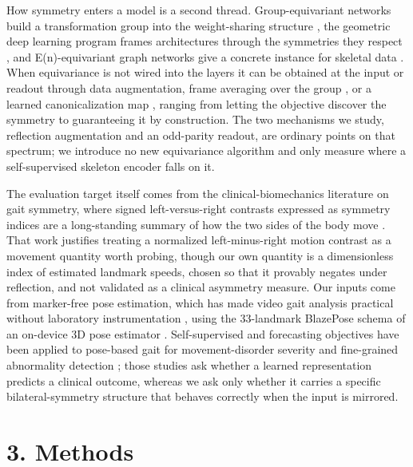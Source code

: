 \documentclass{article}
\begin{document}
How symmetry enters a model is a second thread. Group-equivariant
networks build a transformation group into the weight-sharing structure
\citep{cohen2016gcnn}, the geometric deep learning program frames
architectures through the symmetries they respect
\citep{bronstein2021gdl}, and E(n)-equivariant graph networks give a
concrete instance for skeletal data \citep{satorras2021egnn}. When
equivariance is not wired into the layers it can be obtained at the
input or readout through data augmentation, frame averaging over the
group \citep{puny2022frame}, or a learned canonicalization map
\citep{kaba2023canonicalization}, ranging from letting the objective
discover the symmetry to guaranteeing it by construction. The two
mechanisms we study, reflection augmentation and an odd-parity readout,
are ordinary points on that spectrum; we introduce no new equivariance
algorithm and only measure where a self-supervised skeleton encoder
falls on it.

The evaluation target itself comes from the clinical-biomechanics
literature on gait symmetry, where signed left-versus-right contrasts
expressed as symmetry indices are a long-standing summary of how the two
sides of the body move
\citep{robinson1987symmetry, sadeghi2000symmetry, patterson2010symmetry, blazkiewicz2014symmetry}.
That work justifies treating a normalized left-minus-right motion
contrast as a movement quantity worth probing, though our own quantity
is a dimensionless index of estimated landmark speeds, chosen so that it
provably negates under reflection, and not validated as a clinical
asymmetry measure. Our inputs come from marker-free pose estimation,
which has made video gait analysis practical without laboratory
instrumentation \citep{hii2023markerfree}, using the 33-landmark
BlazePose schema of an on-device 3D pose estimator
\citep{grishchenko2022blazepose, mediapipePoseLandmarker}.
Self-supervised and forecasting objectives have been applied to
pose-based gait for movement-disorder severity
\citep{endo2022gaitforemer} and fine-grained abnormality detection
\citep{duan2024fsgait}; those studies ask whether a learned
representation predicts a clinical outcome, whereas we ask only whether
it carries a specific bilateral-symmetry structure that behaves
correctly when the input is mirrored.

\section{3. Methods}\label{methods}
\end{document}
